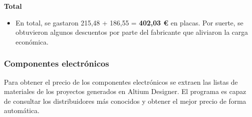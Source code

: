 \hspace{1cm}

\textbf{Total}
\begin{itemize}
	\item En total, se gastaron 215,48 + 186,55 = \textbf{402,03 \euro{}} en placas. Por suerte, se obtuvieron algunos descuentos por parte del fabricante que aliviaron la carga económica.
\end{itemize}
\subsubsection{Componentes electrónicos}
Para obtener el precio de los componentes electrónicos se extraen las listas de materiales de los proyectos generados en Altium Designer. El programa es capaz de consultar los distribuidores más conocidos y obtener el mejor precio de forma automática.

